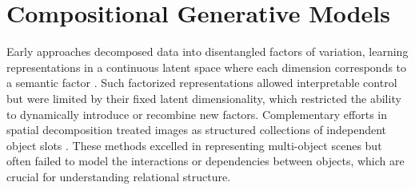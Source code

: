 
\section{Compositional Generative Models}
\label{sec:compositionality_models}


Early approaches decomposed data into disentangled factors of variation, learning representations in a continuous latent space where each dimension corresponds to a semantic factor \citep{higgins2017scan,generative_models_visually_grounded_imagination_2018}.  
Such factorized representations allowed interpretable control but were limited by their fixed latent dimensionality, which restricted the ability to dynamically introduce or recombine new factors.  
Complementary efforts in spatial decomposition treated images as structured collections of independent object slots \citep{steenkiste2019a,multi_object_representation_learning_iterative_variational_inference_2019}.  
These methods excelled in representing multi-object scenes but often failed to model the interactions or dependencies between objects, which are crucial for understanding relational structure.  

